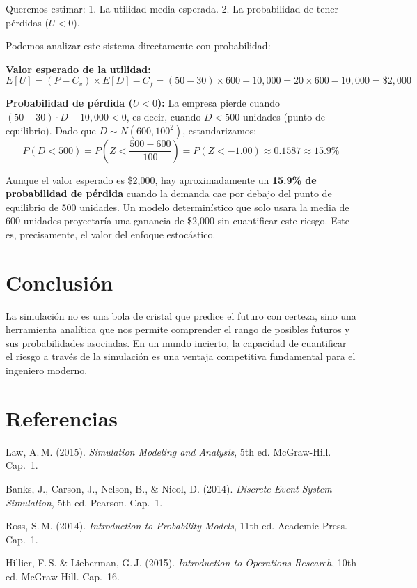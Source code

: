 \documentclass[11pt, letterpaper]{article}
\begin{document}
Queremos estimar:
1. La utilidad media esperada.
2. La probabilidad de tener pérdidas ($U < 0$).

Podemos analizar este sistema directamente con probabilidad:

\textbf{Valor esperado de la utilidad:}
\[ E[U] = (P - C_v) \times E[D] - C_f = (50 - 30) \times 600 - 10{,}000 = 20 \times 600 - 10{,}000 = \$2{,}000 \]

\textbf{Probabilidad de pérdida ($U < 0$):}
La empresa pierde cuando $(50-30) \cdot D - 10{,}000 < 0$, es decir, cuando $D < 500$ unidades (punto de equilibrio). Dado que $D \sim N(600, 100^2)$, estandarizamos:
\[ P(D < 500) = P\!\left(Z < \frac{500 - 600}{100}\right) = P(Z < -1{.}00) \approx 0{.}1587 \approx 15{.}9\% \]

Aunque el valor esperado es \$2{,}000, hay aproximadamente un \textbf{15.9\% de probabilidad de pérdida} cuando la demanda cae por debajo del punto de equilibrio de 500 unidades. Un modelo determinístico que solo usara la media de 600 unidades proyectaría una ganancia de \$2{,}000 sin cuantificar este riesgo. Este es, precisamente, el valor del enfoque estocástico.

\section{Conclusión}
La simulación no es una bola de cristal que predice el futuro con certeza, sino una herramienta analítica que nos permite comprender el rango de posibles futuros y sus probabilidades asociadas. En un mundo incierto, la capacidad de cuantificar el riesgo a través de la simulación es una ventaja competitiva fundamental para el ingeniero moderno.

\section*{Referencias}
\begin{enumerate}[label={[\arabic*]}]
    \item Law, A.\,M. (2015). \textit{Simulation Modeling and Analysis}, 5th ed. McGraw-Hill. Cap.~1.
    \item Banks, J., Carson, J., Nelson, B., \& Nicol, D. (2014). \textit{Discrete-Event System Simulation}, 5th ed. Pearson. Cap.~1.
    \item Ross, S.\,M. (2014). \textit{Introduction to Probability Models}, 11th ed. Academic Press. Cap.~1.
    \item Hillier, F.\,S. \& Lieberman, G.\,J. (2015). \textit{Introduction to Operations Research}, 10th ed. McGraw-Hill. Cap.~16.
\end{enumerate}
\end{document}
